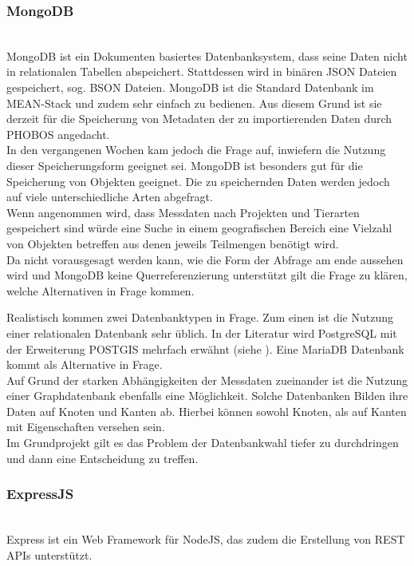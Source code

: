 \documentclass[10pt,conference,compsocconf]{IEEEtran}
\begin{document}
\subsubsection{MongoDB}\hspace*{\fill} \\
MongoDB ist ein Dokumenten basiertes Datenbanksystem, dass seine Daten nicht in relationalen Tabellen abspeichert. Stattdessen wird in binären JSON Dateien gespeichert, sog. BSON Dateien. MongoDB ist die Standard Datenbank im MEAN-Stack und zudem sehr einfach zu bedienen. Aus diesem Grund ist sie derzeit für die Speicherung von Metadaten der zu importierenden Daten durch PHOBOS angedacht.\\
In den vergangenen Wochen kam jedoch die Frage auf, inwiefern die Nutzung dieser Speicherungsform geeignet sei. MongoDB ist besonders gut für die Speicherung von Objekten geeignet. Die zu speichernden Daten werden jedoch auf viele unterschiedliche Arten abgefragt.\\
Wenn angenommen wird, dass Messdaten nach Projekten und Tierarten gespeichert sind würde eine Suche in einem geografischen Bereich eine Vielzahl von Objekten betreffen aus denen jeweils Teilmengen benötigt wird.\\
Da nicht vorausgesagt werden kann, wie die Form der Abfrage am ende aussehen wird und MongoDB keine Querreferenzierung unterstützt gilt die Frage zu klären, welche Alternativen in Frage kommen.\par

Realistisch kommen zwei Datenbanktypen in Frage. Zum einen ist die Nutzung einer relationalen Datenbank sehr üblich. In der Literatur wird PostgreSQL mit der Erweiterung POSTGIS mehrfach erwähnt (siehe \cite{wms_flow_mapping} \cite{waldbiomasse}). Eine MariaDB Datenbank kommt als Alternative in Frage.\\
Auf Grund der starken Abhängigkeiten der Messdaten zueinander ist die Nutzung einer Graphdatenbank ebenfalls eine Möglichkeit. Solche Datenbanken Bilden ihre Daten auf Knoten und Kanten ab. Hierbei können sowohl Knoten, als auf Kanten mit Eigenschaften versehen sein.\\
Im Grundprojekt gilt es das Problem der Datenbankwahl tiefer zu durchdringen und dann eine Entscheidung zu treffen.\vspace{.5em}

\subsubsection{ExpressJS}\hspace*{\fill} \\
Express ist ein Web Framework für NodeJS, das zudem die Erstellung von REST APIs unterstützt.\vspace{.5em}
\end{document}
